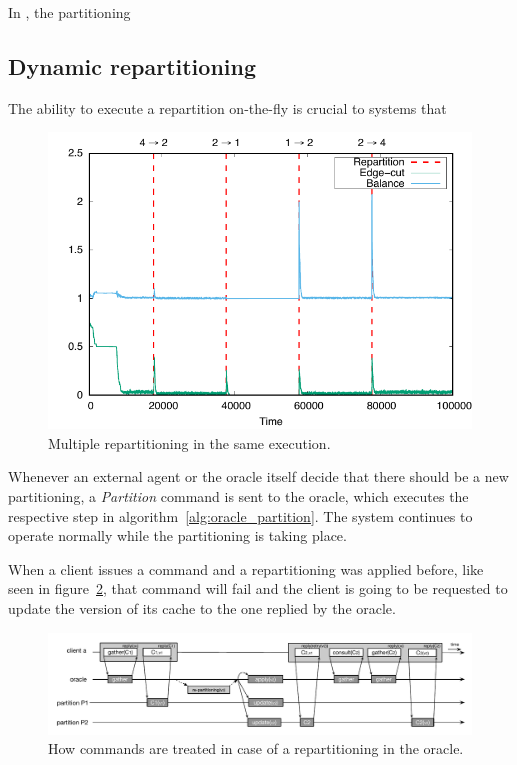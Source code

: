 In \appname, the partitioning 

\subsection{Dynamic repartitioning}
The ability to execute a repartition on-the-fly is crucial to systems that 

\begin{figure}
	\includegraphics[width=1.0\linewidth]{graphs/0.01_edgecuts/repartition/4-2-1-2-4/edge_cut_balance_max_4_part}
	\caption{Multiple repartitioning in the same execution.}
	\label{fig:repartition_4_times}
\end{figure}

Whenever an external agent or the oracle itself decide that there should be a new partitioning, a \emph{Partition} command is sent to the oracle, which executes the respective step in algorithm~\ref{alg:oracle_partition}. The system continues to operate normally while the partitioning is taking place.

When a client issues a command and a repartitioning was applied before, like seen in figure~\ref{fig:oracle_repartition}, that command will fail and the client is going to be requested to update the version of its cache to the one replied by the oracle.




\begin{figure}
\begin{minipage}[b]{1\linewidth} %
\centering
      \includegraphics[width=1.0\linewidth]{figures/repartitioning}
\end{minipage}
\caption{How commands are treated in case of a repartitioning in the oracle.}
\label{fig:oracle_repartition}
\end{figure}
